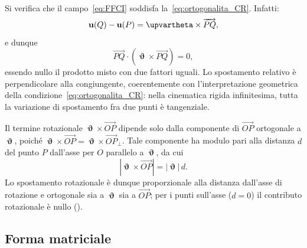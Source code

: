 \medskip

Si verifica che il campo~\eqref{eq:FFCI} soddisfa la~\eqref{eq:ortogonalita_CR}. 
Infatti:
\begin{equation}
	\ub(Q) - \ub(P) = \bm{\upvartheta} \times \overrightarrow{PQ},
\end{equation}
e dunque
\begin{equation}
	\overrightarrow{PQ} \cdot (\bm{\upvartheta} \times \overrightarrow{PQ}) = 0,
\end{equation}
essendo nullo il prodotto misto con due fattori uguali. Lo spostamento 
relativo è perpendicolare alla congiungente, coerentemente con 
l'interpretazione geometrica della condizione~\eqref{eq:ortogonalita_CR}: 
nella cinematica rigida infinitesima, tutta la variazione di spostamento 
fra due punti è tangenziale.



\begin{oss}
	Il termine rotazionale $\bm{\upvartheta} \times \overrightarrow{OP}$
	dipende solo dalla componente di $\overrightarrow{OP}$ ortogonale a
	$\bm{\upvartheta}$, poiché
	$\bm{\upvartheta} \times \overrightarrow{OP}
	= \bm{\upvartheta} \times \overrightarrow{OP}_{\!\perp}$.
	Tale componente ha modulo pari alla distanza $d$ del punto $P$
	dall'asse per $O$ parallelo a $\bm{\upvartheta}$, da cui
	\begin{equation}
		|\bm{\upvartheta} \times \overrightarrow{OP}|
		= |\bm{\upvartheta}|\,d.
	\end{equation}
	Lo spostamento rotazionale è dunque proporzionale alla distanza
	dall'asse di rotazione e ortogonale sia a $\bm{\upvartheta}$ sia a
	$\overrightarrow{OP}$; per i punti sull'asse ($d=0$) il contributo
	rotazionale è nullo ().



\end{oss}







\subsection{Forma matriciale}\label{sec:forma_matriciale}

